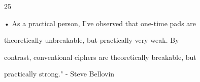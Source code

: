 \documentclass{article}
\begin{document}

25

• As a practical person, I've observed that one-time pads are 

theoretically unbreakable, but practically very weak. By 

contrast, conventional ciphers are theoretically breakable, but 

practically strong." - Steve Bellovin
\end{document}
